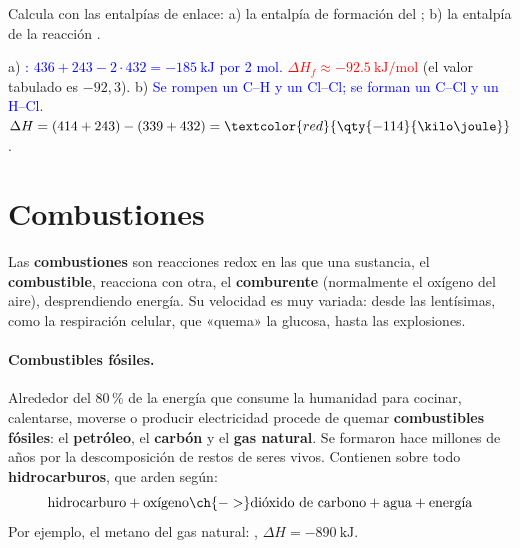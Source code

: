 \begin{exercise}
    Calcula con las entalpías de enlace: a) la entalpía de formación del ; b) la entalpía de la reacción
    .
    \begin{solu}
        a) \textcolor{blue}{: \(436 + 243 - 2 \cdot 432 = \qty{-185}{\kilo\joule}\) por 2 mol.}
        \textcolor{red}{\(\Delta H_f \approx \qty{-92.5}{\kilo\joule\per\mol}\)} (el valor tabulado es \(-92{,}3\)).
        b) \textcolor{blue}{Se rompen un C--H y un Cl--Cl; se forman un C--Cl y un H--Cl.} \(\Delta H = (414 + 243) - (339 + 432) =
        \textcolor{red}{\qty{-114}{\kilo\joule}}\).
    \end{solu}
\end{exercise}

\section{Combustiones}\label{sec:ud6-combustiones}

Las \textbf{combustiones} son reacciones redox en las que una sustancia, el \textbf{combustible}, reacciona con otra, el
\textbf{comburente} (normalmente el oxígeno del aire), desprendiendo energía. Su velocidad es muy variada: desde las lentísimas,
como la respiración celular, que «quema» la glucosa, hasta las explosiones.

\paragraph{Combustibles fósiles.} Alrededor del 80\,\% de la energía que consume la humanidad para cocinar, calentarse, moverse o
producir electricidad procede de quemar \textbf{combustibles fósiles}: el \textbf{petróleo}, el \textbf{carbón} y el \textbf{gas
natural}. Se formaron hace millones de años por la descomposición de restos de seres vivos. Contienen sobre todo
\textbf{hidrocarburos}, que arden según:
\[ \text{hidrocarburo} + \text{oxígeno} \ch{->} \text{dióxido de carbono} + \text{agua} + \text{energía} \]
Por ejemplo, el metano del gas natural: , \(\Delta H = \qty{-890}{\kilo\joule}\).


